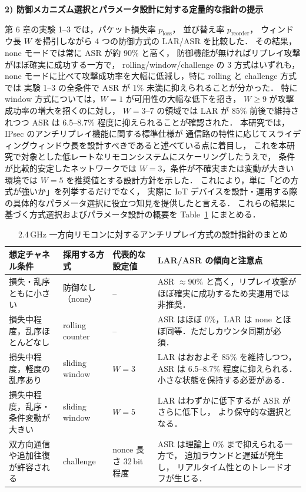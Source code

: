 \documentclass[twocolumn,10pt,a4paper]{jsarticle}
\begin{document}
\vspace{0.5em}
\noindent\textbf{2) 防御メカニズム選択とパラメータ設計に対する定量的な指針の提示}\par
第 6 章の実験 1--3 では，パケット損失率 $p_{\mathrm{loss}}$，
並び替え率 $p_{\mathrm{reorder}}$，
ウィンドウ長 $W$ を掃引しながら 4 つの防御方式の LAR/ASR を比較した．
その結果，none モードでは常に ASR が約 90\% と高く，
防御機能が無ければリプレイ攻撃がほぼ確実に成功する一方で，
rolling/window/challenge の 3 方式はいずれも，
none モードに比べて攻撃成功率を大幅に低減し，特に rolling と challenge 方式では
実験 1--3 の全条件で ASR が 1\% 未満に抑えられることが分かった．
特に window 方式については，$W=1$ が可用性の大幅な低下を招き，
$W \ge 9$ が攻撃成功率の増大を招くのに対し，
$W=3$--7 の領域では LAR が 85\% 前後で維持されつつ
ASR は 6.5--8.7\% 程度に抑えられることが確認された．
本研究では，IPsec のアンチリプレイ機能に関する標準仕様\cite{rfc4303,rfc6479}が
通信路の特性に応じてスライディングウィンドウ長を設計すべきであると述べている点に着目し，
これを本研究で対象とした低レートなリモコンシステムにスケーリングしたうえで，
条件が比較的安定したネットワークでは $W=3$，条件が不確実または変動が大きい環境では
$W=5$ を推奨値とする設計方針を示した．
これにより，単に「どの方式が強いか」を列挙するだけでなく，
実際に IoT デバイスを設計・運用する際の具体的なパラメータ選択に役立つ知見を提供したと言える．
これらの結果に基づく方式選択およびパラメータ設計の概要を
Table~\ref{tab:design-guideline} にまとめる．

\begin{table}[t]
  \centering
  \caption{2.4\,GHz 一方向リモコンに対するアンチリプレイ方式の設計指針のまとめ}
  \label{tab:design-guideline}
  \footnotesize
  \begin{tabularx}{\textwidth}{l l l X}
    \hline
    想定チャネル条件 & 採用する方式 & 代表的な設定値 & LAR/ASR の傾向と注意点 \\
    \hline
    損失・乱序ともに小さい &
    防御なし（none） &
    -- &
    ASR $\approx 90\%$ と高く，リプレイ攻撃がほぼ確実に成功するため実運用では非推奨． \\

    損失中程度，乱序ほとんどなし &
    rolling counter &
    -- &
    ASR はほぼ $0\%$，LAR は none とほぼ同等．ただしカウンタ同期が必須． \\

    損失中程度，軽度の乱序あり &
    sliding window &
    $W = 3$ &
    LAR はおおよそ $85\%$ を維持しつつ，
    ASR は 6.5--8.7\% 程度に抑えられる．
    小さな状態を保持する必要がある． \\

    損失中程度，乱序・条件変動が大きい &
    sliding window &
    $W = 5$ &
    LAR はわずかに低下するが ASR がさらに低下し，
    より保守的な選択となる． \\

    双方向通信や追加往復が許容される &
    challenge &
    nonce 長さ 32\,bit 程度 &
    ASR は理論上 $0\%$ まで抑えられる一方で，
    追加ラウンドと遅延が発生し，
    リアルタイム性とのトレードオフが生じる． \\
    \hline
  \end{tabularx}
\end{table}
\end{document}
